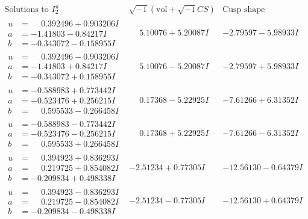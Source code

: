 \documentclass[1p]{elsarticle_modified}
\theoremstyle{definition}
\newcommand{\I}{\sqrt{-1}}
\begin{document}
$$\begin{array}{c|c|c}  
\text{Solutions to }I^u_{2}& \I (\text{vol} + \sqrt{-1}CS) & \text{Cusp shape}\\
 \hline 
\begin{aligned}
u &= \phantom{-}0.392496 + 0.903206 I \\
a &= -1.41803 - 0.84217 I \\
b &= -0.343072 - 0.158955 I\end{aligned}
 & \phantom{-}5.10076 + 5.20087 I & -2.79597 - 5.98933 I \\ \hline\begin{aligned}
u &= \phantom{-}0.392496 - 0.903206 I \\
a &= -1.41803 + 0.84217 I \\
b &= -0.343072 + 0.158955 I\end{aligned}
 & \phantom{-}5.10076 - 5.20087 I & -2.79597 + 5.98933 I \\ \hline\begin{aligned}
u &= -0.588983 + 0.773442 I \\
a &= -0.523476 + 0.256215 I \\
b &= \phantom{-}0.595533 - 0.266458 I\end{aligned}
 & \phantom{-}0.17368 - 5.22925 I & -7.61266 + 6.31352 I \\ \hline\begin{aligned}
u &= -0.588983 - 0.773442 I \\
a &= -0.523476 - 0.256215 I \\
b &= \phantom{-}0.595533 + 0.266458 I\end{aligned}
 & \phantom{-}0.17368 + 5.22925 I & -7.61266 - 6.31352 I \\ \hline\begin{aligned}
u &= \phantom{-}0.394923 + 0.836293 I \\
a &= \phantom{-}0.219725 + 0.854082 I \\
b &= -0.209834 + 0.498338 I\end{aligned}
 & -2.51234 + 0.77305 I & -12.56130 - 0.64379 I \\ \hline\begin{aligned}
u &= \phantom{-}0.394923 - 0.836293 I \\
a &= \phantom{-}0.219725 - 0.854082 I \\
b &= -0.209834 - 0.498338 I\end{aligned}
 & -2.51234 - 0.77305 I & -12.56130 + 0.64379 I \\ \hline\begin{aligned}

\end{aligned}
\end{array}$$
\end{document}
